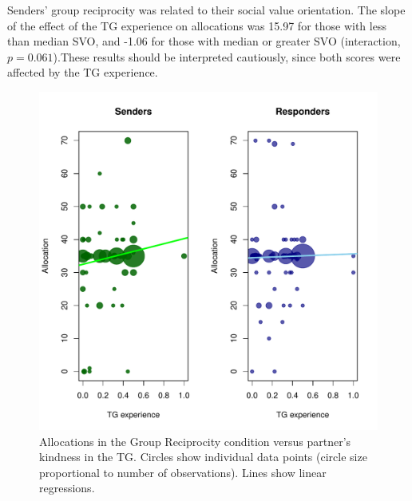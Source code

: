 \documentclass[12pt,a4paper]{article}\usepackage[]{graphicx}\usepackage[]{color}
\makeatletter
\def\maxwidth{ %
  \ifdim\Gin@nat@width>\linewidth
    \linewidth
  \else
    \Gin@nat@width
  \fi
}
\newenvironment{knitrout}{}{} %
\makeatother
\begin{document}

Senders' group reciprocity was related to their social value orientation. The slope of the effect of the TG experience on allocations was 
15.97 for those with less than median SVO, and 
-1.06 for those with median or greater SVO 
(interaction, $p= 0.061$).These results should be interpreted cautiously, since both scores were 
affected by the TG experience. 

\begin{knitrout}
\color{fgcolor}\begin{figure}
\includegraphics[width=\maxwidth]{figure/plots-1} \caption[Allocations in the Group Reciprocity condition versus partner's kindness in the TG]{Allocations in the Group Reciprocity condition versus partner's kindness in the TG. Circles show individual data points (circle size proportional to number of observations). Lines show linear regressions.}\label{fig:plots}
\end{figure}


\end{knitrout}
\end{document}

